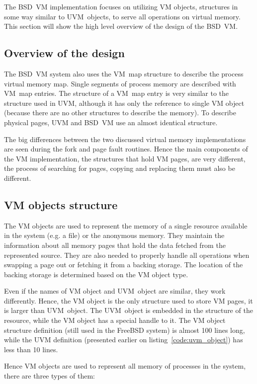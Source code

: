 The BSD~VM implementation focuses on utilizing VM objects, structures in some way similar to UVM~objects, to serve all operations on virtual memory.
This section will show the high level overview of the design of the BSD~VM.

\subsection{Overview of the design}

The BSD~VM system also uses the VM~map structure to describe the process virtual memory map.
Single segments of process memory are described with VM~map entries.
The structure of a VM~map entry is very similar to the structure used in UVM, although it has only
the reference to single VM object (because there are no other structures to describe the memory).
To describe physical pages, UVM and BSD~VM use an almost identical structure.

The big differences between the two discussed virtual memory implementations are seen during the fork and page fault routines.
Hence the main components of the VM implementation, the structures that hold VM pages, are very different,
the process of searching for pages, copying and replacing them must also be different.

\subsection{VM objects structure}

The VM objects are used to represent the memory of a single resource available in the system (e.g. a file) or the anonymous memory.
They maintain the information about all memory pages that hold the data fetched from the represented source.
They are also needed to properly handle all operations when swapping a page out or fetching it from a backing storage.
The location of the backing storage is determined based on the VM object type.

Even if the names of VM object and UVM~object are similar, they work differently.
Hence, the VM object is the only structure used to store VM pages, it is larger than UVM~object.
The UVM~object is embedded in the structure of the resource, while the VM object has a special handle to it.
The VM object structure definition (still used in the FreeBSD system) is almost 100 lines long,
while the UVM definition (presented earlier on listing~\ref{code:uvm_object}) has less than 10 lines.

Hence VM objects are used to represent all memory of processes in the system, there are three types of them:

